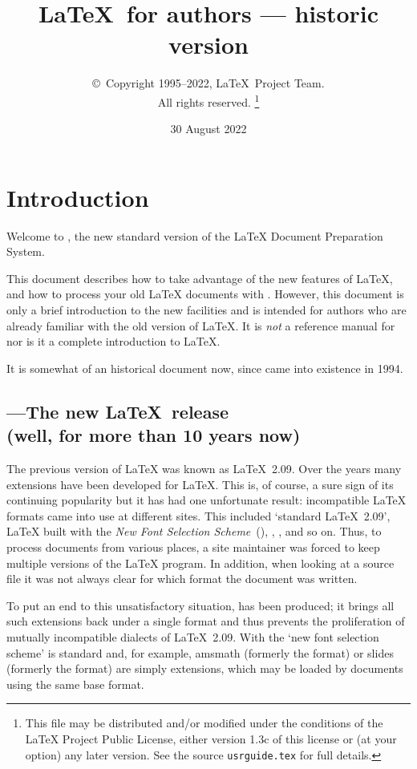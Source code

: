 \documentclass{ltxguide}[2001/05/28]
\title{\LaTeX\ for authors --- historic version}
\author{\copyright~Copyright 1995--2022, \LaTeX\ Project Team.\\
   All rights reserved.%
   \footnote{This file may be distributed and/or modified under the
     conditions of the \LaTeX{} Project Public License, either version 1.3c
     of this license or (at your option) any later version. See the source
    \texttt{usrguide.tex} for full details.}%
}
\date{30 August 2022}
\begin{document}
\maketitle

\tableofcontents

\section{Introduction}

Welcome to \LaTeXe, the new standard version of the \LaTeX{} Document
Preparation System.

This document describes how to take advantage of the new features of
\LaTeX, and how to process your old \LaTeX{} documents with
\LaTeXe. However, this document is only a brief introduction to the
new facilities and is intended for authors who are already familiar
with the old version of \LaTeX{}.  It is \emph{not} a reference manual
for \LaTeXe{} nor is it a complete introduction to \LaTeX.

It is somewhat of an historical document now, since \LaTeXe{} came into
existence in 1994.

\subsection[\LaTeXe---The new \LaTeX~release]
  {\LaTeXe---The new \LaTeX~release\\ (well, for more than 10 years now)}

The previous version of \LaTeX{} was known as \LaTeX~2.09.  Over the
years many extensions have been developed for \LaTeX.  This is, of
course, a sure sign of its continuing popularity but it has had one
unfortunate result: incompatible \LaTeX{} formats came into use at
different sites.  This included `standard \LaTeX~2.09', \LaTeX{} built
with the \emph{New Font Selection Scheme}~(\NFSS), \SLiTeX, \AmSLaTeX,
and so on.  Thus, to process documents from various places, a site
maintainer was forced to keep multiple versions of the \LaTeX{}
program.  In addition, when looking at a source file it was not always
clear for which format the document was written.

To put an end to this unsatisfactory situation, \LaTeXe{} has been
produced; it brings all such extensions back under a single format and
thus prevents the proliferation of mutually incompatible dialects of
\LaTeX~2.09.  With \LaTeXe{} the `new font selection scheme' is
standard and, for example, \textsf{amsmath} (formerly the \AmSLaTeX{}
format) or \textsf{slides} (formerly the \SLiTeX{} format) are simply
extensions, which may be loaded by documents using the same base format.
\end{document}
